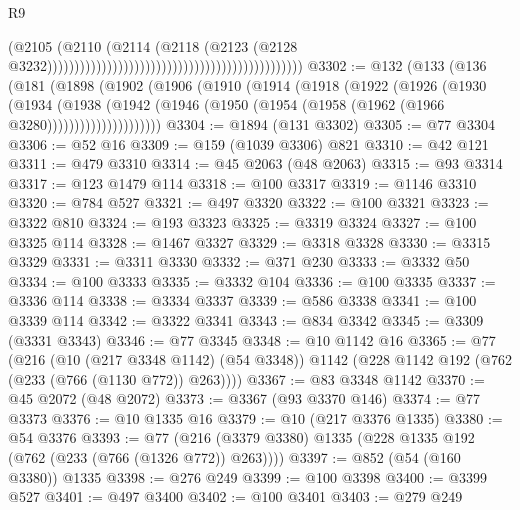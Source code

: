\begin{lexlean}{R9}
\begin{coremodule}
{{{{{{{{{{{{{{{{{{{{{{{{{{{{{{{{{{{{{{{{{{{{{{{{{{{{{{{{{{{{{{{{{{{{{{{{{{{{{{{{{{{{{{{{{{{{{{{{{{{{{{{{{{{{                                                                                      (@2105
                                                                                        (@2110
                                                                                          (@2114
                                                                                            (@2118
                                                                                              (@2123
                                                                                                (@2128
                                                                                                  @3232)))))))))))))))))))))))))))))))))))))))))))))))
@3302 := @132
    (@133
      (@136
        (@181
          (@1898
            (@1902
              (@1906
                (@1910
                  (@1914
                    (@1918
                      (@1922
                        (@1926
                          (@1930
                            (@1934
                              (@1938
                                (@1942
                                  (@1946
                                    (@1950 (@1954 (@1958 (@1962 (@1966 @3280)))))))))))))))))))))
@3304 := @1894 (@131 @3302)
@3305 := @77 @3304
@3306 := @52 @16
@3309 := @159 (@1039 @3306) @821
@3310 := @42 @121
@3311 := @479 @3310
@3314 := @45 @2063 (@48 @2063)
@3315 := @93 @3314
@3317 := @123 @1479 @114
@3318 := @100 @3317
@3319 := @1146 @3310
@3320 := @784 @527
@3321 := @497 @3320
@3322 := @100 @3321
@3323 := @3322 @810
@3324 := @193 @3323
@3325 := @3319 @3324
@3327 := @100 @3325 @114
@3328 := @1467 @3327
@3329 := @3318 @3328
@3330 := @3315 @3329
@3331 := @3311 @3330
@3332 := @371 @230
@3333 := @3332 @50
@3334 := @100 @3333
@3335 := @3332 @104
@3336 := @100 @3335
@3337 := @3336 @114
@3338 := @3334 @3337
@3339 := @586 @3338
@3341 := @100 @3339 @114
@3342 := @3322 @3341
@3343 := @834 @3342
@3345 := @3309 (@3331 @3343)
@3346 := @77 @3345
@3348 := @10 @1142 @16
@3365 := @77
    (@216
      (@10 (@217 @3348 @1142) (@54 @3348))
      @1142
      (@228 @1142 @192 (@762 (@233 (@766 (@1130 @772)) @263))))
@3367 := @83 @3348 @1142
@3370 := @45 @2072 (@48 @2072)
@3373 := @3367 (@93 @3370 @146)
@3374 := @77 @3373
@3376 := @10 @1335 @16
@3379 := @10 (@217 @3376 @1335)
@3380 := @54 @3376
@3393 := @77 (@216 (@3379 @3380) @1335 (@228 @1335 @192 (@762 (@233 (@766 (@1326 @772)) @263))))
@3397 := @852 (@54 (@160 @3380)) @1335
@3398 := @276 @249
@3399 := @100 @3398
@3400 := @3399 @527
@3401 := @497 @3400
@3402 := @100 @3401
@3403 := @279 @249
}}}}}}}}}}}}}}}}}}}}}}}}}}}}}}}}}}}}}}}}}}}}}}}}}}}}}}}}}}}}}}}}}}}}}}}}}}}}}}}}}}}}}}}}}}}}}}}}}}}}}}}}}}}}
\end{coremodule}
\end{lexlean}
